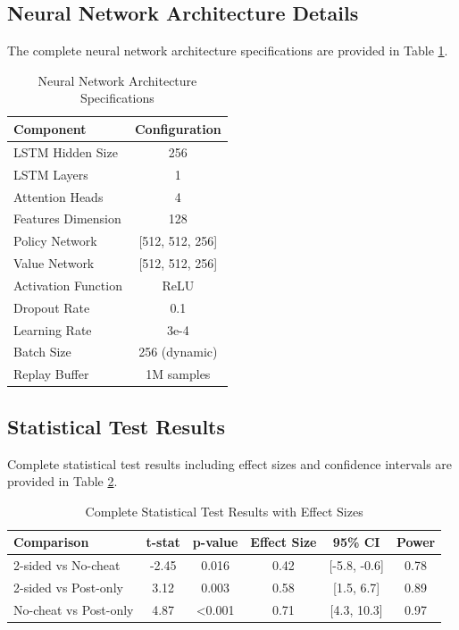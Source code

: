 \documentclass[conference]{IEEEtran}
\begin{document}
\subsection{Neural Network Architecture Details}

The complete neural network architecture specifications are provided in Table \ref{tab:nn_arch}.

\begin{table}[!t]
\renewcommand{\arraystretch}{1.3}
\caption{Neural Network Architecture Specifications}
\label{tab:nn_arch}
\centering
\begin{tabular}{|l|c|}
\hline
\textbf{Component} & \textbf{Configuration} \\
\hline
LSTM Hidden Size & 256 \\
LSTM Layers & 1 \\
Attention Heads & 4 \\
Features Dimension & 128 \\
Policy Network & [512, 512, 256] \\
Value Network & [512, 512, 256] \\
Activation Function & ReLU \\
Dropout Rate & 0.1 \\
Learning Rate & 3e-4 \\
Batch Size & 256 (dynamic) \\
Replay Buffer & 1M samples \\
\hline
\end{tabular}
\end{table}

\subsection{Statistical Test Results}

Complete statistical test results including effect sizes and confidence intervals are provided in Table \ref{tab:complete_stats}.

\begin{table}[!t]
\renewcommand{\arraystretch}{1.3}
\caption{Complete Statistical Test Results with Effect Sizes}
\label{tab:complete_stats}
\centering
\begin{tabular}{|l|c|c|c|c|c|}
\hline
\textbf{Comparison} & \textbf{t-stat} & \textbf{p-value} & \textbf{Effect Size} & \textbf{95\% CI} & \textbf{Power} \\
\hline
2-sided vs No-cheat & -2.45 & 0.016 & 0.42 & [-5.8, -0.6] & 0.78 \\
2-sided vs Post-only & 3.12 & 0.003 & 0.58 & [1.5, 6.7] & 0.89 \\
No-cheat vs Post-only & 4.87 & <0.001 & 0.71 & [4.3, 10.3] & 0.97 \\
\hline
\end{tabular}
\end{table}
\end{document}
